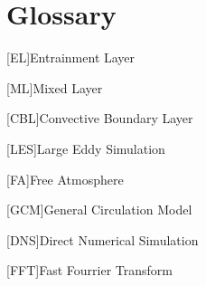 
\chapter{Glossary}







\begin{acronym}
[EL]{Entrainment Layer}
\end{acronym}

\begin{acronym}
[ML]{Mixed Layer}
\end{acronym}

\begin{acronym}
[CBL]{Convective Boundary Layer}
\end{acronym}

\begin{acronym}
[LES]{Large Eddy Simulation}
\end{acronym}

\begin{acronym}
[FA]{Free Atmosphere}
\end{acronym}

\begin{acronym}
[GCM]{General Circulation Model}
\end{acronym}

\begin{acronym}
[DNS]{Direct Numerical Simulation}
\end{acronym}

\begin{acronym}
[FFT]{Fast Fourrier Transform}
\end{acronym}

